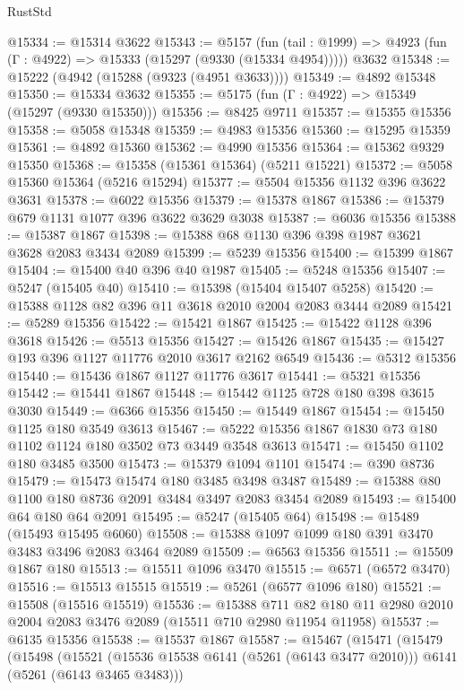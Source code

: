 \begin{lexlean}{RustStd}
\begin{coremodule}
@15334 := @15314 @3622
@15343 := @5157
    (fun (tail : @1999) => @4923 (fun (Γ : @4922) => @15333 (@15297 (@9330 (@15334 @4954)))))
    @3632
@15348 := @15222 (@4942 (@15288 (@9323 (@4951 @3633))))
@15349 := @4892 @15348
@15350 := @15334 @3632
@15355 := @5175 (fun (Γ : @4922) => @15349 (@15297 (@9330 @15350)))
@15356 := @8425 @9711
@15357 := @15355 @15356
@15358 := @5058 @15348
@15359 := @4983 @15356
@15360 := @15295 @15359
@15361 := @4892 @15360
@15362 := @4990 @15356
@15364 := @15362 @9329 @15350
@15368 := @15358 (@15361 @15364) (@5211 @15221)
@15372 := @5058 @15360 @15364 (@5216 @15294)
@15377 := @5504 @15356 @1132 @396 @3622 @3631
@15378 := @6022 @15356
@15379 := @15378 @1867
@15386 := @15379 @679 @1131 @1077 @396 @3622 @3629 @3038
@15387 := @6036 @15356
@15388 := @15387 @1867
@15398 := @15388 @68 @1130 @396 @398 @1987 @3621 @3628 @2083 @3434 @2089
@15399 := @5239 @15356
@15400 := @15399 @1867
@15404 := @15400 @40 @396 @40 @1987
@15405 := @5248 @15356
@15407 := @5247 (@15405 @40)
@15410 := @15398 (@15404 @15407 @5258)
@15420 := @15388 @1128 @82 @396 @11 @3618 @2010 @2004 @2083 @3444 @2089
@15421 := @5289 @15356
@15422 := @15421 @1867
@15425 := @15422 @1128 @396 @3618
@15426 := @5513 @15356
@15427 := @15426 @1867
@15435 := @15427 @193 @396 @1127 @11776 @2010 @3617 @2162 @6549
@15436 := @5312 @15356
@15440 := @15436 @1867 @1127 @11776 @3617
@15441 := @5321 @15356
@15442 := @15441 @1867
@15448 := @15442 @1125 @728 @180 @398 @3615 @3030
@15449 := @6366 @15356
@15450 := @15449 @1867
@15454 := @15450 @1125 @180 @3549 @3613
@15467 := @5222 @15356 @1867 @1830 @73 @180 @1102 @1124 @180 @3502 @73 @3449 @3548 @3613
@15471 := @15450 @1102 @180 @3485 @3500
@15473 := @15379 @1094 @1101
@15474 := @390 @8736
@15479 := @15473 @15474 @180 @3485 @3498 @3487
@15489 := @15388 @80 @1100 @180 @8736 @2091 @3484 @3497 @2083 @3454 @2089
@15493 := @15400 @64 @180 @64 @2091
@15495 := @5247 (@15405 @64)
@15498 := @15489 (@15493 @15495 @6060)
@15508 := @15388 @1097 @1099 @180 @391 @3470 @3483 @3496 @2083 @3464 @2089
@15509 := @6563 @15356
@15511 := @15509 @1867 @180
@15513 := @15511 @1096 @3470
@15515 := @6571 (@6572 @3470)
@15516 := @15513 @15515
@15519 := @5261 (@6577 @1096 @180)
@15521 := @15508 (@15516 @15519)
@15536 := @15388
    @711
    @82
    @180
    @11
    @2980
    @2010
    @2004
    @2083
    @3476
    @2089
    (@15511 @710 @2980 @11954 @11958)
@15537 := @6135 @15356
@15538 := @15537 @1867
@15587 := @15467
    (@15471
      (@15479
        (@15498
          (@15521
            (@15536 @15538 @6141 (@5261 (@6143 @3477 @2010)))
            @6141
            (@5261 (@6143 @3465 @3483)))

\end{coremodule}
\end{lexlean}
